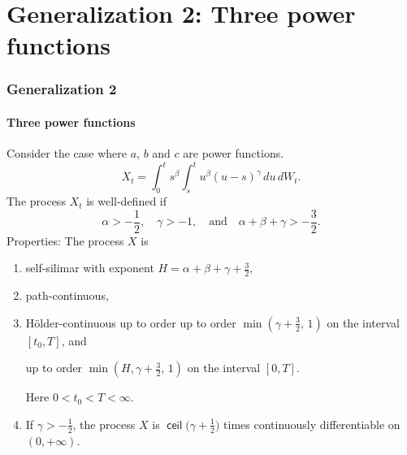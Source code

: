 \documentclass{beamer}
\DeclareMathOperator{\ceil}{\mathsf{ceil}}
\theoremstyle{plain}
\theoremstyle{definition}
\theoremstyle{remark}
\begin{document}
\section{Generalization 2: Three power functions}
\begin{frame}
	\frametitle{Generalization 2}
	\framesubtitle{Three power functions}
Consider the case where $a$, $b$ and $c$ are power functions.
\begin{equation}\label{eq:Xpower}
X_t = \int_0^t s^\beta \int_s^t u^\beta (u-s)^\gamma \,  du \, dW_t.
\end{equation}
The process $X_t$ is well-defined if
\begin{equation}\label{neq:condXpower}
\alpha>-\frac12, \quad \gamma>-1, \quad
\mbox{and} \quad
\alpha+\beta+\gamma>-\frac32.
\end{equation}
Properties: The process $X$ is
\begin{enumerate}
\item self-silimar with exponent
$H = \alpha+\beta+\gamma+\frac32 ,$
\item path-continuous,
\item H\"older-continuous up to order
up to order $\min(\gamma+\frac32, \, 1)$
on the interval $[t_0, T]$,
and

up to order $\min(H, \gamma+\frac32, \, 1)$
on the interval $[0, T]$.

Here $0<t_0<T<\infty$.
\item
If $\gamma>-\frac12$, the process $X$ is
$\ceil\bigl(\gamma+\frac12\bigr)$ times
continuously differentiable on $(0,+\infty)$.
\end{enumerate}
\end{frame}
\end{document}
